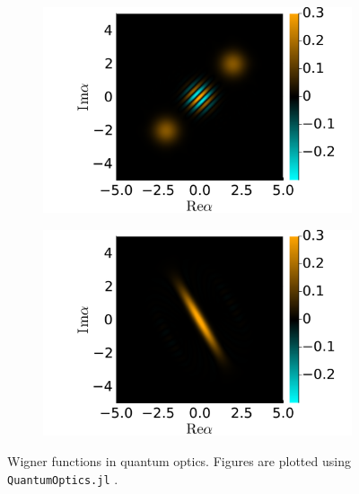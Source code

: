 \documentclass[hyperref, a4paper]{article}
\begin{document}
\begin{figure}
\begin{subfigure}{0.45\textwidth}
        \subcaption{}
    \end{subfigure}
    \begin{subfigure}{0.45\textwidth}
        \centering
        \includegraphics[width=\textwidth]{heatmaps/coherent-state-composition.pdf}
        \subcaption{} 
    \end{subfigure}
    \begin{subfigure}{0.45\textwidth}
        \centering
        \includegraphics[width=\textwidth]{heatmaps/squeezed-state.pdf}
        \subcaption{}
    \end{subfigure}
    \begin{subfigure}{0.45\textwidth}
        
        \subcaption{}
    \end{subfigure}
    \caption{Wigner functions in quantum optics. 
    Figures are plotted using \texttt{QuantumOptics.jl} \cite{kramer2018quantumoptics}.
}
\end{figure}
\end{document}
